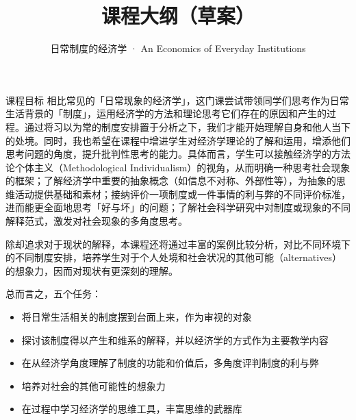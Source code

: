 \documentclass[10pt,a4paper]{ctexart}
\title{\vspace{-2em}\bfseries 课程大纲（草案）}
\author{日常制度的经济学 · An Economics of Everyday Institutions}
\begin{document}
\maketitle
\thispagestyle{fancy}

\begin{keybox}{课程目标}
    相比常见的「日常现象的经济学」，这门课尝试带领同学们思考作为日常生活背景的「制度」，运用经济学的方法和理论思考它们存在的原因和产生的过程。通过将习以为常的制度安排置于分析之下，我们才能开始理解自身和他人当下的处境。同时，我也希望在课程中增进学生对经济学理论的了解和运用，增添他们思考问题的角度，提升批判性思考的能力。具体而言，学生可以接触经济学的方法论个体主义（Methodological Individualism）的视角，从而明确一种思考社会现象的框架；了解经济学中重要的抽象概念（如信息不对称、外部性等），为抽象的思维活动提供基础和素材；接纳评价一项制度或一件事情的利与弊的不同评价标准，进而能更全面地思考「好与坏」的问题；了解社会科学研究中对制度或现象的不同解释范式，激发对社会现象的多角度思考。

    除却追求对于现状的解释，本课程还将通过丰富的案例比较分析，对比不同环境下的不同制度安排，培养学生对于个人处境和社会状况的其他可能（alternatives）的想象力，因而对现状有更深刻的理解。

    总而言之，五个任务：
    \begin{itemize}
      \item 将日常生活相关的制度摆到台面上来，作为审视的对象
      \item 探讨该制度得以产生和维系的解释，并以经济学的方式作为主要教学内容
      \item 在从经济学角度理解了制度的功能和价值后，多角度评判制度的利与弊
      \item 培养对社会的其他可能性的想象力
      \item 在过程中学习经济学的思维工具，丰富思维的武器库
    \end{itemize}
\end{keybox}


\end{document}
